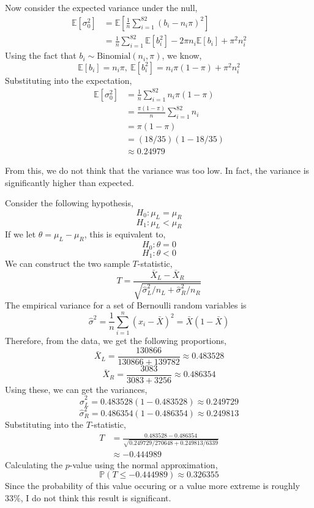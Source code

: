 \documentclass[12pt,twoside]{article}
\begin{document}
\begin{problems}
\begin{problemparts}
Now consider the expected variance under the null,
\begin{align*}
    \mathbb{E}[\sigma_0^2] &= \mathbb{E}\left[\frac{1}{n} \sum_{i = 1}^{82}
    (b_i - n_i \pi)^2\right] \\
    &= \frac{1}{n} \sum_{i = 1}^{82} \mathbb{E}[b_i^2] - 2 \pi n_i
    \mathbb{E}[b_i] + \pi^2 n_i^2
\end{align*}
Using the fact that $b_i \sim \mathrm{Binomial}(n_i, \pi)$, we know,
$$ \mathbb{E}[b_i] = n_i \pi,\ \mathbb{E}[b_i^2] = n_i \pi (1 - \pi) + \pi^2
n_i^2 $$
Substituting into the expectation,
\begin{align*}
    \mathbb{E}[\sigma_0^2] &= \frac{1}{n} \sum_{i = 1}^{82} n_i \pi (1 - \pi) \\
    &= \frac{\pi (1 - \pi)}{n} \sum_{i = 1}^{82} n_i \\
    &= \pi (1 - \pi) \\
    &= (18/35) (1 - 18/35) \\
    &\approx \boxed{0.24979}
\end{align*}

From this, we do not think that the variance was too low. In fact, the
variance is significantly higher than expected.

\end{problemparts}

\newpage

\problem  %

Consider the following hypothesis,
$$ H_0 : \mu_L = \mu_R $$
$$ H_1 : \mu_L < \mu_R $$
If we let $\theta = \mu_L - \mu_R$, this is equivalent to,
$$ H_0 : \theta = 0 $$
$$ H_1 : \theta < 0 $$
We can construct the two sample $T$-statistic,
$$ T = \frac{\bar{X}_L - \bar{X}_R}{\sqrt{\hat{\sigma}_L^2/n_L +
\hat{\sigma}_R^2/n_R}} $$
The empirical variance for a set of Bernoulli random variables is
$$ \hat{\sigma}^2 = \frac{1}{n} \sum_{i = 1}^n (x_i - \bar{X})^2 = \bar{X} (1
- \bar{X}) $$
Therefore, from the data, we get the following proportions,
$$ \bar{X}_L = \frac{130866}{130866 + 139782} \approx 0.483528 $$
$$ \bar{X}_R = \frac{3083}{3083 + 3256} \approx 0.486354 $$
Using these, we can get the variances,
$$ \hat{\sigma}_L^2 = 0.483528 (1 - 0.483528) \approx 0.249729 $$
$$ \hat{\sigma}_R^2 = 0.486354 (1 - 0.486354) \approx 0.249813 $$
Substituting into the $T$-statistic,
\begin{align*}
    T &= \frac{0.483528 - 0.486354}{\sqrt{0.249729/270648 + 0.249813/6339}} \\
    &\approx -0.444989
\end{align*}
Calculating the $p$-value using the normal approximation,
$$ \mathbb{P}(T \leq -0.444989) \approx \boxed{0.326355} $$
Since the probability of this value occuring or a value more extreme is
roughly 33\%, I do not think this result is significant.


\end{problems}
\end{document}
